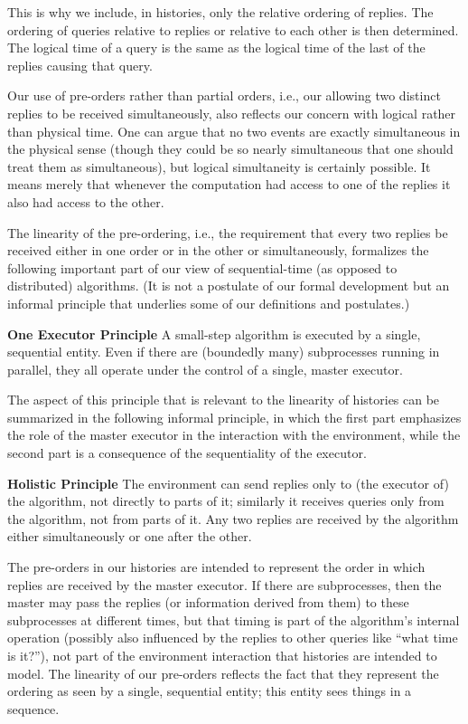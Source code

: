 \documentclass{LMCS}
\theoremstyle{definition}
\newenvironment{unn}[1]{\bigskip\noindent\textbf{#1}\quad}{\par\bigskip}
\begin{document}
This is why we include, in histories, only the relative ordering of
replies.  The ordering of queries relative to replies or relative to
each other is then determined.  The logical time of a query is the
same as the logical time of the last of the replies causing that
query.

Our use of pre-orders rather than partial orders, i.e., our allowing
two distinct replies to be received simultaneously, also reflects our
concern with logical rather than physical time.  One can argue that no
two events are exactly simultaneous in the physical sense (though they
could be so nearly simultaneous that one should treat them as
simultaneous), but logical simultaneity is certainly possible.  It
means merely that whenever the computation had access to one of the
replies it also had access to the other.

The linearity of the pre-ordering, i.e., the requirement that every
two replies be received either in one order or in the other or
simultaneously, formalizes the following important part of our view of
sequential-time (as opposed to distributed) algorithms.  (It is not a
postulate of our formal development but an informal principle that
underlies some of our definitions and postulates.)

\begin{unn}{One Executor Principle}
A small-step algorithm is executed by a single, sequential entity.
Even if there are (boundedly many) subprocesses running in parallel,
they all operate under the control of a single, master executor.
\end{unn}

The aspect of this principle that is relevant to the linearity of
histories can be summarized in the following informal principle, in
which the first part emphasizes the role of the master executor in the
interaction with the environment, while the second part is a
consequence of the sequentiality of the executor.

\begin{unn}{Holistic Principle}
The environment can send replies only to (the executor of) the
algorithm, not directly to parts of it; similarly it receives queries
only from the algorithm, not from parts of it.  Any two replies are
received by the algorithm either simultaneously or one after the
other.
\end{unn}

The pre-orders in our histories are intended to represent the order in
which replies are received by the master executor.  If there are
subprocesses, then the master may pass the replies (or information
derived from them) to these subprocesses at different times, but that
timing is part of the algorithm's internal operation (possibly also
influenced by the replies to other queries like ``what time is it?''),
not part of the environment interaction that histories are intended to
model.  The linearity of our pre-orders reflects the fact that they
represent the ordering as seen by a single, sequential entity; this
entity sees things in a sequence.
\end{document}
